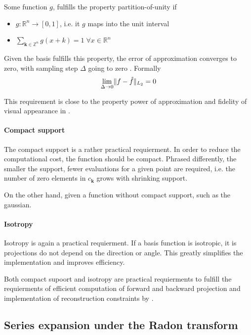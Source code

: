 Some function $g$, fulfills the property partition-of-unity if
\begin{itemize}
    \item $g: \mathbb{R}^n \to [0, 1]$, i.e. it $g$ maps into the unit interval
    \item $\sum_{\bm{k} \in \mathbb{Z}^n} g(x + k) = 1 \; \forall x \in \mathbb{R}^n$
\end{itemize}
Given the basis fulfills this property, the error of approximation converges to zero, with sampling 
step $\Delta$ going to zero \cite{nilchian_optimized_2015}. Formally
\begin{equation}
    \lim_{\Delta \to 0} \lVert f - \hat{f}\rVert_{L_2} = 0
\end{equation}

This requirement is close to the property power of approximation and fidelity of visual
appearance in \cite{hanson_local_1985}.

\paragraph{Compact support}

The compact support is a rather practical requierment. In order to reduce the computational cost,
the function should be compact. Phrased differently, the smaller the support, fewer evaluations
for a given point are required, i.e. the number of zero elements in $c_{\bm{k}}$ grows with shrinking
support.

On the other hand, given a function without compact support, such as the gaussian.

\paragraph{Isotropy}

Isotropy is again a practical requierment. If a basis function is isotropic, it is projections
do not depend on the direction or angle. This greatly simplifies the implementation and improves efficiency.

Both compact supoort and isotropy are practical requierments to fulfill the requierments of
efficient computation of forward and backward projection and implementation of reconstruction constraints
by \cite{hanson_local_1985}.

\subsection{Series expansion under the Radon transform}

